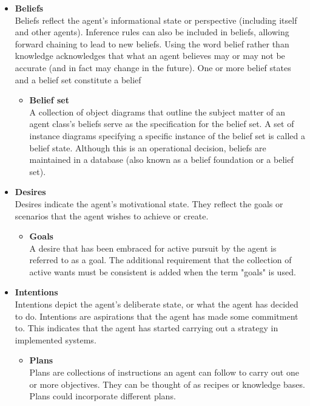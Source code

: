 \begin{itemize}
    \item \textbf{Beliefs} \\
    Beliefs reflect the agent's informational state or perspective (including itself and other agents). Inference rules can also be included in beliefs, allowing forward chaining to lead to new beliefs. Using the word belief rather than knowledge acknowledges that what an agent believes may or may not be accurate (and in fact may change in the future). One or more belief states and a belief set constitute a belief 
 
    \begin{itemize}[label={}]
        \item \textbf{Belief set} \\
        A collection of object diagrams that outline the subject matter of an agent class's beliefs serve as the specification for the belief set. A set of instance diagrams specifying a specific instance of the belief set is called a belief state. Although this is an operational decision, beliefs are maintained in a database (also known as a belief foundation or a belief set).
    \end{itemize}

\item \textbf{Desires} \\
Desires indicate the agent's motivational state. They reflect the goals or scenarios that the agent wishes to achieve or create.

    \begin{itemize}[label={}]
        \item \textbf{Goals} \\
        A desire that has been embraced for active pursuit by the agent is referred to as a goal. The additional requirement that the collection of active wants must be consistent is added when the term "goals" is used.
    \end{itemize}

\item \textbf{Intentions} \\
Intentions depict the agent's deliberate state, or what the agent has decided to do. Intentions are aspirations that the agent has made some commitment to. This indicates that the agent has started carrying out a strategy in implemented systems.
    
    \begin{itemize}[label={}]
        \item \textbf{Plans} \\
        Plans are collections of instructions an agent can follow to carry out one or more objectives. They can be thought of as recipes or knowledge bases. Plans could incorporate different plans.
    

\end{itemize}
\end{itemize}

